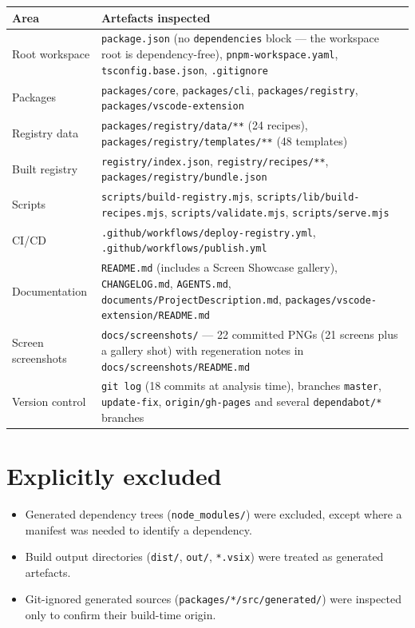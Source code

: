 \begin{table}[H]
\centering
\caption{Analysis scope and artefacts inspected}
\begin{longtable}{p{4.4cm}p{10cm}}
\toprule
\textbf{Area} & \textbf{Artefacts inspected} \\
\midrule
\endhead
Root workspace & \texttt{package.json} (no \texttt{dependencies} block --- the workspace root is dependency-free),
\texttt{pnpm-workspace.yaml}, \texttt{tsconfig.base.json}, \texttt{.gitignore} \\
Packages & \texttt{packages/core}, \texttt{packages/cli}, \texttt{packages/registry}, \texttt{packages/vscode-extension} \\
Registry data & \texttt{packages/registry/data/**} (24 recipes), \texttt{packages/registry/templates/**} (48 templates) \\
Built registry & \texttt{registry/index.json}, \texttt{registry/recipes/**}, \texttt{packages/registry/bundle.json} \\
Scripts & \texttt{scripts/build-registry.mjs}, \texttt{scripts/lib/build-recipes.mjs}, \texttt{scripts/validate.mjs}, \texttt{scripts/serve.mjs} \\
CI/CD & \texttt{.github/workflows/deploy-registry.yml}, \texttt{.github/workflows/publish.yml} \\
Documentation & \texttt{README.md} (includes a Screen Showcase gallery), \texttt{CHANGELOG.md}, \texttt{AGENTS.md}, \texttt{documents/ProjectDescription.md}, \texttt{packages/vscode-extension/README.md} \\
Screen screenshots & \texttt{docs/screenshots/} --- 22 committed PNGs (21 screens plus a gallery shot) with regeneration notes in \texttt{docs/screenshots/README.md} \\
Version control & \texttt{git log} (18 commits at analysis time), branches \texttt{master}, \texttt{update-fix}, \texttt{origin/gh-pages} and several \texttt{dependabot/*} branches \\
\bottomrule
\end{longtable}
\end{table}

\section*{Explicitly excluded}

\begin{itemize}
  \item Generated dependency trees (\texttt{node\_modules/}) were excluded, except
        where a manifest was needed to identify a dependency.
  \item Build output directories (\texttt{dist/}, \texttt{out/}, \texttt{*.vsix}) were
        treated as generated artefacts.
  \item Git-ignored generated sources (\texttt{packages/*/src/generated/}) were
        inspected only to confirm their build-time origin.
\end{itemize}

